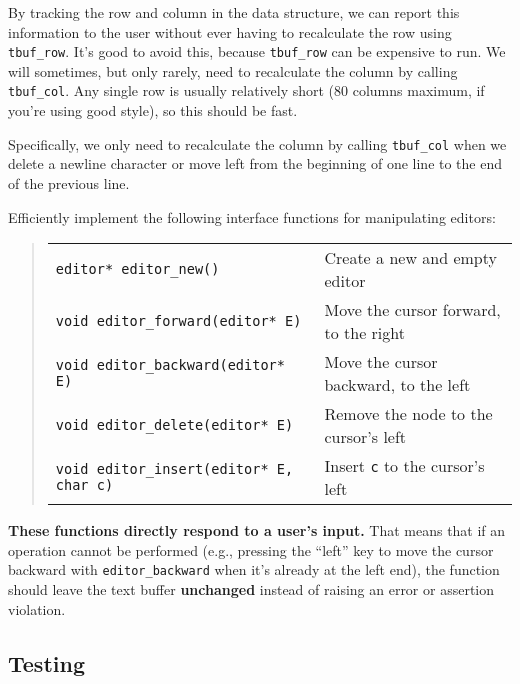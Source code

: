 \documentclass[12pt]{exam}
\begin{document}
By tracking the row and column in the data structure, we can report
this information to the user without ever having to recalculate the
row using \lstinline'tbuf_row'. It's good to avoid this, because
\lstinline'tbuf_row' can be expensive to run. We will sometimes, but
only rarely, need to recalculate the column by calling
\lstinline'tbuf_col'. Any single row is usually relatively short (80
columns maximum, if you're using good style), so this should be fast.

Specifically, we only need to recalculate the column by calling
\lstinline'tbuf_col' when we delete a newline character or move left
from the beginning of one line to the end of the previous line.

\clearpage
\begin{task}[6]
Efficiently implement the following interface functions for
manipulating editors:

\begin{quote}
\begin{tabular}{p{}p{}}
 \lstinline"editor* editor_new()" & Create a new and empty editor \\
 \lstinline"void editor_forward(editor* E)" & Move the cursor forward, to the right \\
 \lstinline"void editor_backward(editor* E)" & Move the cursor backward, to the left \\
 \lstinline"void editor_delete(editor* E)" & Remove the node to the cursor's left \\
 \lstinline"void editor_insert(editor* E, char c)" & Insert \lstinline'c' to the cursor's left \\
\end{tabular}
\end{quote}
\end{task}
\textbf{These functions directly respond to a user's input.}  That
means that if an operation cannot be performed (e.g., pressing the
``left'' key to move the cursor backward with
\lstinline'editor_backward' when it's already at the left end), the
function should leave the text buffer \textbf{unchanged} instead of
raising an error or assertion violation.


\subsection{Testing}
\end{document}
